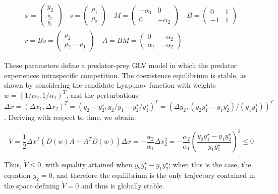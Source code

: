 \documentclass{article}
\begin{document}
\begin{equation}
\begin{aligned}
x = \begin{pmatrix}
y_2\\
\frac{y_2}{y_1}
\end{pmatrix}
\quad
s = \begin{pmatrix}
\rho_1 \\
\rho_2
\end{pmatrix}
\quad
M = \begin{pmatrix}
-\alpha_1 & 0\\
0 & -\alpha_2
\end{pmatrix}
\quad
B = \begin{pmatrix}
0 & 1\\
-1 & 1
\end{pmatrix}
\\
r = Bs= \begin{pmatrix}
\rho_2\\
\rho_2 - \rho_1
\end{pmatrix}
\quad 
A = BM = \begin{pmatrix}
0 & -\alpha_2\\
\alpha_1 & -\alpha_2
\end{pmatrix}
\end{aligned}
\end{equation}

These parameters define a predator-prey GLV model in which the predator
experiences intraspecific competition. The coexistence equilibrium is
stable, as shown by considering the candidate Lyapunov function with
weights \(w = (1/\alpha_2,1/\alpha_1)^T\), and the perturbations
\(\Delta x = (\Delta x_1, \Delta x_2)^T = (y_2 - y_2^\star, y_2/y_1 - y_2^\star / y_1^\star)^T = (\Delta y_2, (y_2 y_1^\star - y_1 y_2^\star)/(y_1 y_1^\star))^T\).
Deriving with respect to time, we obtain:

\begin{equation}
\dot{V} = \frac{1}{2} \Delta x^T (D(w) A + A^T D(w)) \Delta x =  - \frac{\alpha_2}{\alpha_1} \Delta x_2^2 = -\frac{\alpha_2}{\alpha_1} \left( \frac{y_2 y_1^\star - y_1 y_2^\star}{y_1 y_1^\star}\right)^2\leq 0
\end{equation}

Thus, \(\dot{V} \leq 0\), with equality attained when
\(y_2 y_1^\star - y_1 y_2^\star\); when this is the case, the equation
\(\dot{y}_2 = 0\), and therefore the equilibrium is the only trajectory
contained in the space defining \(\dot{V} = 0\) and thus is globally
stable.
\end{document}

